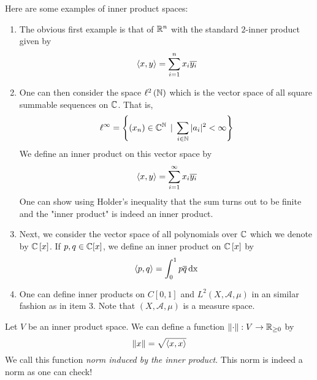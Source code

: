 \begin{example}
    Here are some examples of inner product spaces:
    \begin{enumerate}
	\item The obvious first example is that of $\mathbb R ^{n}$ with the standard $2$-inner product given by
	    \begin{equation*}
		\left\langle x,y \right\rangle = \sum_{i=1}^{n} x_{i} \overline{y_{i}}
	    \end{equation*}

	\item One can then consider the space $\ell ^{2} \left( \mathbb N \right)$ which is the vector space of all square summable sequences on $\mathbb C$. That is,
	    \begin{equation*}
		\ell ^{\infty} = \left\{ \left( x_{n} \right) \in \mathbb C ^{\mathbb N} \, \mid \, \sum_{i\in \mathbb N} |a_i|^{2} < \infty \right\} \end{equation*}
We define an inner product on this vector space by 
 \begin{equation*}
		\left\langle x,y \right\rangle = \sum_{i=1}^{\infty} x_{i} \overline{y_{i}}
	    \end{equation*}
	    One can show using Holder's inequality that the sum turns out to be finite and the "inner product" is indeed an inner product.
	\item Next, we consider the vector space of all polynomials over $\mathbb C$ which we denote by $\mathbb C \left[ x \right]$. If $p , q \in \mathbb C [x]$, we define an inner product on $\mathbb C \left[ x \right]$ by 
	    \begin{equation*}
		\left\langle p,q \right\rangle = \int_{0}^{1} p\overline q \, \mathrm{dx}
	    \end{equation*}
	\item One can define inner products on $C[0,1]$ and $L^{2} (X, \mathscr A , \mu)$ in an similar fashion as in item 3. Note that $\left( X, \mathscr A, \mu \right)$ is a measure space.
    \end{enumerate}
\end{example}

\begin{definition}
    Let $V$ be an inner product space. We can define a function $\left\lVert \cdot \right\rVert : V \to \mathbb R _{\ge 0}$ by
    \begin{equation*}
	\left\lVert x \right\rVert = \sqrt{\left\langle x,x \right\rangle}
    \end{equation*}
    We call this function \textit{norm induced by the inner product}. This norm is indeed a norm as one can check!
    \label{def:norm-induced-by-ip}
\end{definition}

